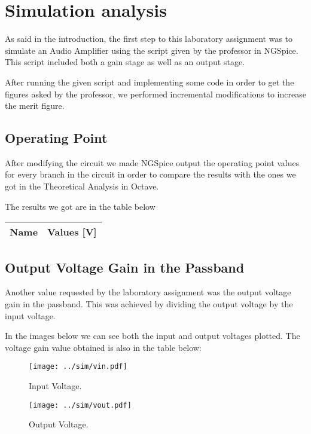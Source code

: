 \section{Simulation analysis}
\label{sec:simulation}
As said in the introduction, the first step to this laboratory assignment was to simulate an Audio Amplifier using the script given by the professor in NGSpice. This script included both a gain stage as well as an output stage.\par
After running the given script and implementing some code in order to get the figures asked by the professor, we performed incremental modifications to increase the merit figure.

\subsection{Operating Point}
After modifying the circuit we made NGSpice output the operating point values for every branch in the circuit in order to compare the results with the ones we got in the Theoretical Analysis in Octave. \par
The results we got are in the table below

\begin{table}[H]
  \centering
  \begin{tabular}{|l|r|}
    \hline    
    {\bf Name} & {\bf Values [V]} \\ \hline
    
  \end{tabular}
  \label{tab:op}
\end{table}

\subsection{Output Voltage Gain in the Passband}
Another value requested by the laboratory assignment was the output voltage gain in the passband. This was achieved by dividing the output voltage by the input voltage. \par
In the images below we can see both the input and output voltages plotted. The voltage gain value obtained is also in the table below:

\begin{figure}[H] \centering
\texttt{[image: ../sim/vin.pdf]}
\caption{Input Voltage.}
\label{fig:input}
\end{figure}

\begin{figure}[H] \centering
\texttt{[image: ../sim/vout.pdf]}
\caption{Output Voltage.}
\label{fig:output}
\end{figure}

